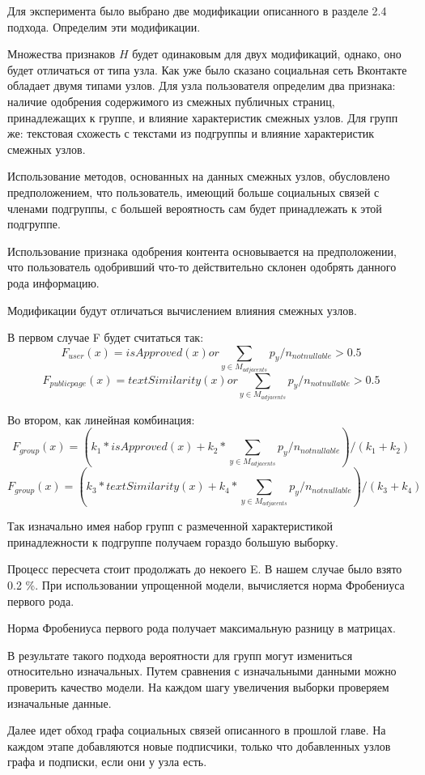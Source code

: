 \documentclass[annotation,times,page4]{itmo-student-thesis}
\begin{document}
Для эксперимента было выбрано две модификации описанного в разделе 2.4 подхода. 
Определим эти модификации.

Множества признаков $H$ будет одинаковым для двух модификаций, однако, оно будет отличаться от типа узла. Как уже было сказано социальная сеть Вконтакте обладает двумя типами узлов. Для узла пользователя определим два признака: наличие одобрения содержимого из смежных публичных страниц, принадлежащих к группе, и влияние характеристик смежных узлов. Для групп же: текстовая схожесть с текстами из подгруппы и влияние характеристик смежных узлов.

Использование методов, основанных на данных смежных узлов, обусловлено предположением, что пользователь, имеющий больше социальных связей с членами подгруппы, с большей вероятность сам будет принадлежать к этой подгруппе.

Использование признака одобрения контента основывается на предположении, что пользователь одобривший что-то действительно склонен одобрять данного рода информацию.


Модификации будут отличаться вычислением влияния смежных узлов.

В первом случае F будет считаться так:
\[
    F_{user}(x) = isApproved(x) or \sum_{y \in M_{adjacents}}p_{y}/n_{notnullable} > 0.5 
\]
\[
    F_{publicpage}(x) = textSimilarity(x) or \sum_{y \in M_{adjacents}}p_{y}/n_{notnullable} > 0.5 
\]

Во втором, как линейная комбинация:
\[
    F_{group}(x) = (k_{1} * isApproved(x) + k_{2} * \sum_{y \in M_{adjacents}}p_{y}/n_{notnullable}) / (k_{1} + k_{2}) 
\] 
\[
    F_{group}(x) = (k_{3} * textSimilarity(x) + k_{4} * \sum_{y \in M_{adjacents}}p_{y}/n_{notnullable}) / (k_{3} + k_{4}) 
\] 


Так изначально имея набор групп с размеченной характеристикой принадлежности к подгруппе получаем гораздо большую выборку. 

Процесс пересчета стоит продолжать до некоего E. В нашем случае было взято 0.2 \%.
При использовании упрощенной модели, вычисляется норма Фробениуса первого рода. 
  
Норма Фробениуса первого рода получает максимальную разницу в матрицах.

В результате такого подхода вероятности для групп могут измениться относительно изначальных. Путем сравнения с изначальными данными можно проверить качество модели.
На каждом шагу увеличения выборки проверяем изначальные данные.


Далее идет обход графа социальных связей описанного в прошлой главе. На каждом этапе добавляются новые подписчики, только что добавленных узлов графа и подписки, если они у узла есть.
\end{document}
